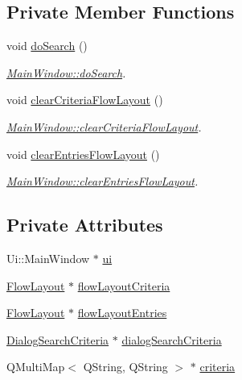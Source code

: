 \subsection*{Private Member Functions}
\begin{DoxyCompactItemize}
\item 
void \hyperlink{class_main_window_a587dd8ed3e896b4c047e66cc1c0c62a5}{do\+Search} ()
\begin{DoxyCompactList}\small\item\em \hyperlink{class_main_window_a587dd8ed3e896b4c047e66cc1c0c62a5}{Main\+Window\+::do\+Search}. \end{DoxyCompactList}\item 
void \hyperlink{class_main_window_a961c54c30f2992fc82039385d3fc8983}{clear\+Criteria\+Flow\+Layout} ()
\begin{DoxyCompactList}\small\item\em \hyperlink{class_main_window_a961c54c30f2992fc82039385d3fc8983}{Main\+Window\+::clear\+Criteria\+Flow\+Layout}. \end{DoxyCompactList}\item 
void \hyperlink{class_main_window_a4387a9bb100d6a47ea900af89d625b0a}{clear\+Entries\+Flow\+Layout} ()
\begin{DoxyCompactList}\small\item\em \hyperlink{class_main_window_a4387a9bb100d6a47ea900af89d625b0a}{Main\+Window\+::clear\+Entries\+Flow\+Layout}. \end{DoxyCompactList}\end{DoxyCompactItemize}
\subsection*{Private Attributes}
\begin{DoxyCompactItemize}
\item 
Ui\+::\+Main\+Window $\ast$ \hyperlink{class_main_window_a35466a70ed47252a0191168126a352a5}{ui}
\item 
\hyperlink{class_flow_layout}{Flow\+Layout} $\ast$ \hyperlink{class_main_window_aa63757c984cb46dbe48e53efba08fb23}{flow\+Layout\+Criteria}
\item 
\hyperlink{class_flow_layout}{Flow\+Layout} $\ast$ \hyperlink{class_main_window_a51e44ed7a8024e94c17e87f817e7fbb3}{flow\+Layout\+Entries}
\item 
\hyperlink{class_dialog_search_criteria}{Dialog\+Search\+Criteria} $\ast$ \hyperlink{class_main_window_ac2f0214d0545709112d53986b9bbe9de}{dialog\+Search\+Criteria}
\item 
Q\+Multi\+Map$<$ Q\+String, Q\+String $>$ $\ast$ \hyperlink{class_main_window_a08a32bfae3ca7c8b1dc028a834ec3497}{criteria}
\end{DoxyCompactItemize}


